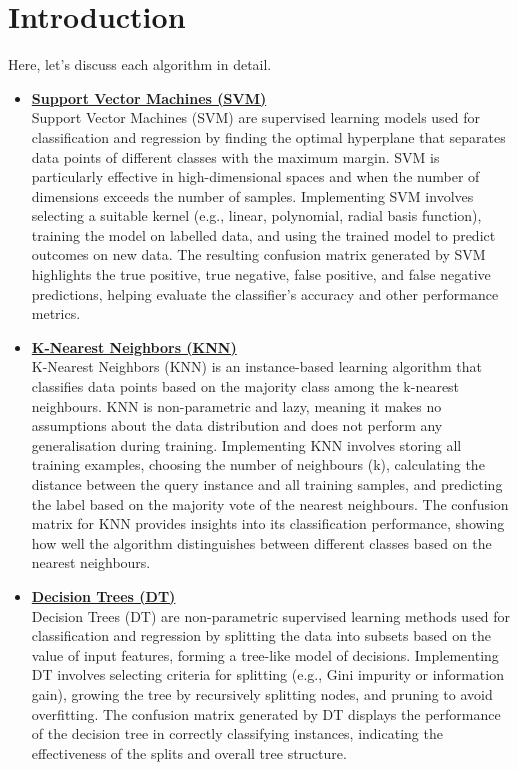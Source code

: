 \documentclass[12pt,a4paper]{report}
\begin{document}
\chapter{Introduction}
\begin{spacing}{1.5}
Here, let's discuss each algorithm in detail.
\begin{itemize}
 \item\underline{\textbf{Support Vector Machines (SVM)}} \\
Support Vector Machines (SVM) are supervised learning models used for classification and regression by finding the optimal hyperplane that separates data points of different classes with the maximum margin. SVM is particularly effective in high-dimensional spaces and when the number of dimensions exceeds the number of samples. Implementing SVM involves selecting a suitable kernel (e.g., linear, polynomial, radial basis function), training the model on labelled data, and using the trained model to predict outcomes on new data. The resulting confusion matrix generated by SVM highlights the true positive, true negative, false positive, and false negative predictions, helping evaluate the classifier’s accuracy and other performance metrics.
\\
\item\underline{\textbf{K-Nearest Neighbors (KNN)}} \\
K-Nearest Neighbors (KNN) is an instance-based learning algorithm that classifies data points based on the majority class among the k-nearest neighbours. KNN is non-parametric and lazy, meaning it makes no assumptions about the data distribution and does not perform any generalisation during training. Implementing KNN involves storing all training examples, choosing the number of neighbours (k), calculating the distance between the query instance and all training samples, and predicting the label based on the majority vote of the nearest neighbours. The confusion matrix for KNN provides insights into its classification performance, showing how well the algorithm distinguishes between different classes based on the nearest neighbours.
\\
\item\underline{\textbf{Decision Trees (DT)}} \\
Decision Trees (DT) are non-parametric supervised learning methods used for classification and regression by splitting the data into subsets based on the value of input features, forming a tree-like model of decisions. Implementing DT involves selecting criteria for splitting (e.g., Gini impurity or information gain), growing the tree by recursively splitting nodes, and pruning to avoid overfitting. The confusion matrix generated by DT displays the performance of the decision tree in correctly classifying instances, indicating the effectiveness of the splits and overall tree structure.

\end{itemize}
\end{spacing}
\end{document}
